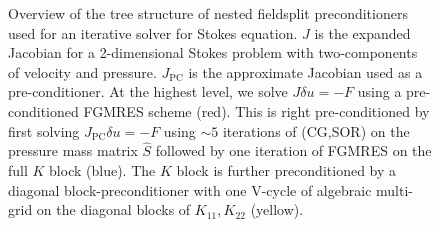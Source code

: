 \begin{figure}[h!]
  \caption{\label{fig:fieldsplit_stokes} Overview of the tree
    structure of nested fieldsplit preconditioners used  for an
    iterative solver for Stokes equation.  $J$ is the expanded
    Jacobian for a 2-dimensional Stokes problem with two-components of
  velocity and pressure.  $J_{\text{PC}}$ is the approximate Jacobian
  used as a pre-conditioner.  At the highest level, we solve $J\delta
  u=-F$ using a pre-conditioned FGMRES scheme (red).  This is
  right pre-conditioned by first solving $J_{\text{PC}}\delta u = -F$
  using $\sim5$ iterations  of (CG,SOR) on the pressure mass matrix
  $\hat{S}$ followed by one iteration of FGMRES on the full $K$ block
  (blue).  The $K$ block is further  preconditioned by a diagonal
  block-preconditioner with one V-cycle of   algebraic multi-grid on
  the diagonal blocks of $K_{11}, K_{22}$ (yellow).}
 \end{figure}


